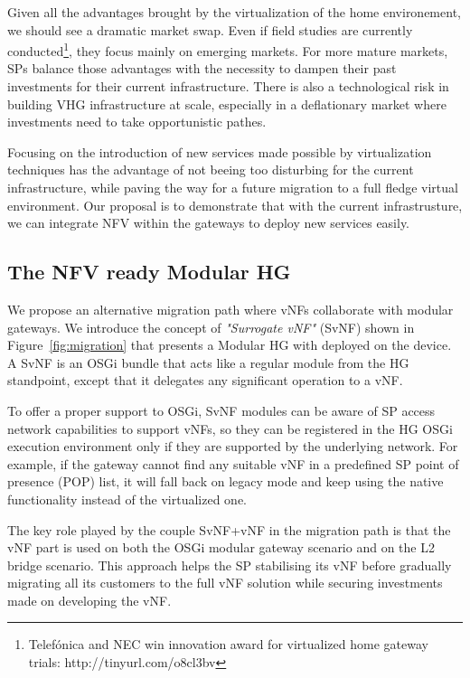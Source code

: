 

Given all the advantages brought by the virtualization of the home environement, we should see a dramatic market swap.
Even if field studies are currently conducted\footnote{Telefónica and NEC win innovation award for virtualized home gateway trials: http://tinyurl.com/o8cl3bv}, they focus mainly on emerging markets.
For more mature markets, SPs balance those advantages with the necessity to dampen their past investments for their current infrastructure.
There is also a technological risk in building VHG infrastructure at scale, especially in a deflationary market where investments need to take opportunistic pathes. 

Focusing on the introduction of new services made possible by virtualization techniques has the advantage of not beeing too disturbing for the current infrastructure, while paving the way for a future migration to a full fledge virtual environment. Our proposal is to demonstrate that with the current infrastrusture, we can integrate NFV within the gateways to deploy new services easily.


\subsection{The NFV ready Modular HG}
We propose an alternative migration path where vNFs collaborate with modular gateways. We introduce the concept of \textit{"Surrogate vNF"} (SvNF) shown in Figure~\ref{fig:migration} that presents a Modular HG with  deployed on the device.
A SvNF is an OSGi bundle that acts like a regular module from the HG standpoint, except that it delegates any significant operation to a vNF.

To offer a proper support to OSGi, SvNF modules can be aware of SP access network capabilities to support vNFs, so they can be registered in the HG OSGi execution environment only if they are supported by the underlying network.
For example, if the gateway cannot find any suitable vNF in a predefined SP point of presence (POP) list, it will fall back on legacy mode and keep using the native functionality instead of the virtualized one.

The key role played by the couple SvNF+vNF in the migration path is that the vNF part is used on both the OSGi modular gateway scenario and on the L2 bridge scenario.
This approach helps the SP stabilising its vNF before gradually migrating all its customers to the full vNF solution while securing investments made on developing the vNF.
 
